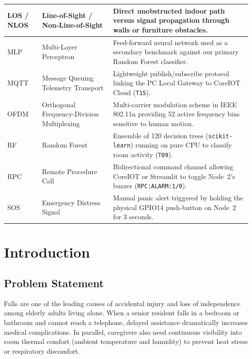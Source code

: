 \documentclass{hcmut-report}
\begin{document}
\begin{table}[H]
\begin{tabularx}{\textwidth}{|P{2.2cm}|P{4.8cm}|Y|}
\hline
LOS / NLOS & Line-of-Sight / Non-Line-of-Sight & Direct unobstructed indoor path versus signal propagation through walls or furniture obstacles. \\
\hline
MLP & Multi-Layer Perceptron & Feed-forward neural network used as a secondary benchmark against our primary Random Forest classifier. \\
\hline
MQTT & Message Queuing Telemetry Transport & Lightweight publish/subscribe protocol linking the PC Local Gateway to CoreIOT Cloud (\texttt{T15}). \\
\hline
OFDM & Orthogonal Frequency-Division Multiplexing & Multi-carrier modulation scheme in IEEE 802.11n providing 52 active frequency bins sensitive to human motion. \\
\hline
RF & Random Forest & Ensemble of 120 decision trees (\texttt{scikit-learn}) running on pure CPU to classify room activity (\texttt{T09}). \\
\hline
RPC & Remote Procedure Call & Bidirectional command channel allowing CoreIOT or Streamlit to toggle Node~2's buzzer (\texttt{RPC:ALARM:1/0}). \\
\hline
SOS & Emergency Distress Signal & Manual panic alert triggered by holding the physical GPIO14 push-button on Node~2 for 3 seconds. \\
\hline
\end{tabularx}
\end{table}

\newpage

\section{Introduction}

\subsection{Problem Statement}
Falls are one of the leading causes of accidental injury and loss of independence among elderly adults living alone. When a senior resident falls in a bedroom or bathroom and cannot reach a telephone, delayed assistance dramatically increases medical complications. In parallel, caregivers also need continuous visibility into room thermal comfort (ambient temperature and humidity) to prevent heat stress or respiratory discomfort.
\end{document}
